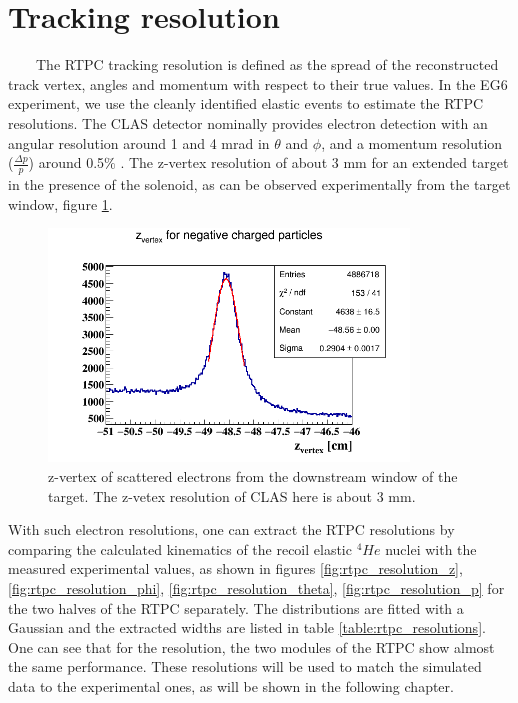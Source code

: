 \section{Tracking resolution}
~~~~The RTPC tracking resolution is defined as the spread of the reconstructed 
track vertex, angles and momentum with respect to their true values. In the EG6 
experiment, we use the cleanly identified elastic events to estimate the RTPC 
resolutions. The CLAS detector nominally provides electron detection with an 
angular resolution around 1 and 4 mrad in $\theta$ and $\phi$, and a momentum 
resolution ($\frac{\Delta p}{p}$) around 0.5$\%$ \cite{CLASref}. The z-vertex 
resolution of about 3 mm for an extended target in the presence of the 
solenoid, as can be observed experimentally from the target window, figure 
\ref{fig:electron_z_vertex_res}. \\
\begin{figure}[tbp]
   \centering
   \includegraphics[height=6.2cm]{fig_rtpc/clas_z_resolution.png}
   \caption{ z-vertex of scattered electrons from the downstream window of the 
   target. The z-vetex resolution of CLAS here is about 3 mm.}
   \label{fig:electron_z_vertex_res}
\end{figure}

With such electron resolutions, one can extract the RTPC resolutions by 
comparing the calculated kinematics of the recoil elastic $^4He$ nuclei  with 
the measured experimental values, as shown in figures 
\ref{fig:rtpc_resolution_z}, \ref{fig:rtpc_resolution_phi}, 
\ref{fig:rtpc_resolution_theta}, \ref{fig:rtpc_resolution_p} for the two halves 
of the RTPC separately. The distributions are fitted with a Gaussian and the 
extracted widths are listed in table \ref{table:rtpc_resolutions}.  One can see 
that for the resolution, the two modules of the RTPC show almost the same 
performance. These resolutions will be used to match the simulated data to the 
experimental ones, as will be shown in the following chapter.\\

